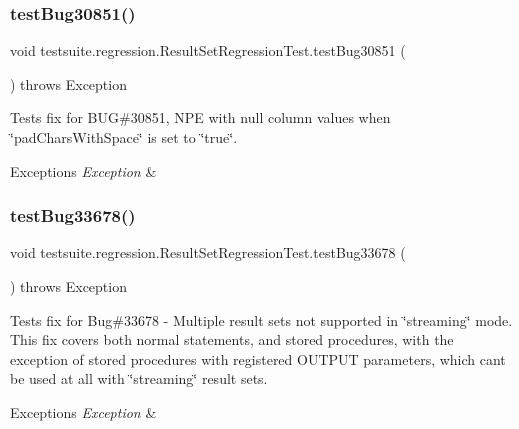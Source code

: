 \subsubsection{\texorpdfstring{test\+Bug30851()}{testBug30851()}}
{\footnotesize\ttfamily void testsuite.\+regression.\+Result\+Set\+Regression\+Test.\+test\+Bug30851 (\begin{DoxyParamCaption}{ }\end{DoxyParamCaption}) throws Exception}

Tests fix for B\+UG\#30851, N\+PE with null column values when \char`\"{}pad\+Chars\+With\+Space\char`\"{} is set to \char`\"{}true\char`\"{}.


\begin{DoxyExceptions}{Exceptions}
{\em Exception} & \\
\hline
\end{DoxyExceptions}
\mbox{\label{classtestsuite_1_1regression_1_1_result_set_regression_test_a6f45076cd422b1dadc631967a3520dbd}} 
\subsubsection{\texorpdfstring{test\+Bug33678()}{testBug33678()}}
{\footnotesize\ttfamily void testsuite.\+regression.\+Result\+Set\+Regression\+Test.\+test\+Bug33678 (\begin{DoxyParamCaption}{ }\end{DoxyParamCaption}) throws Exception}

Tests fix for Bug\#33678 -\/ Multiple result sets not supported in \char`\"{}streaming\char`\"{} mode. This fix covers both normal statements, and stored procedures, with the exception of stored procedures with registered O\+U\+T\+P\+UT parameters, which can\textquotesingle{}t be used at all with \char`\"{}streaming\char`\"{} result sets.


\begin{DoxyExceptions}{Exceptions}
{\em Exception} & \\
\hline
\end{DoxyExceptions}
\mbox{\label{classtestsuite_1_1regression_1_1_result_set_regression_test_ad141201442a5e2f03f7674ee44357a5e}} 
